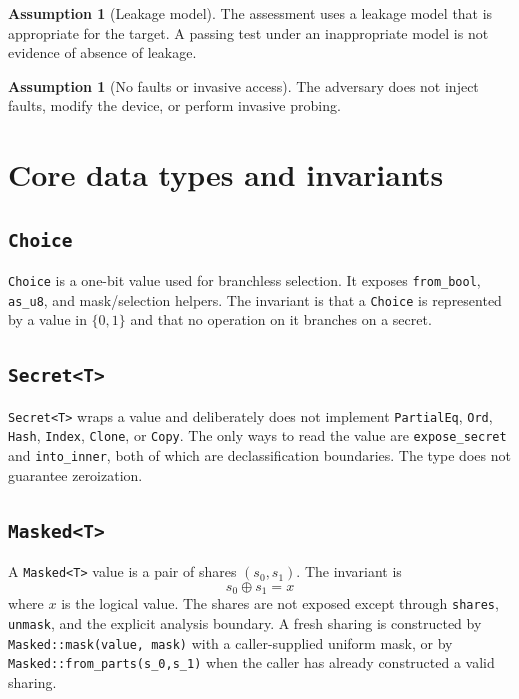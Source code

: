 \documentclass[11pt,a4paper]{article}
\newcommand{\code}[1]{\texttt{#1}}
\theoremstyle{plain}
\theoremstyle{definition}
\newtheorem{assumption}[theorem]{Assumption}
\theoremstyle{remark}
\begin{document}
\begin{assumption}[Leakage model]\label{asm:model}
The assessment uses a leakage model that is appropriate for the target. A passing test
under an inappropriate model is not evidence of absence of leakage.
\end{assumption}

\begin{assumption}[No faults or invasive access]\label{asm:fault}
The adversary does not inject faults, modify the device, or perform invasive probing.
\end{assumption}

\section{Core data types and invariants}\label{sec:types}

\subsection{\code{Choice}}

\code{Choice} is a one-bit value used for branchless selection. It exposes
\code{from\_bool}, \code{as\_u8}, and mask/selection helpers. The invariant is that a
\code{Choice} is represented by a value in \(\{0,1\}\) and that no operation on it
branches on a secret.

\subsection{\code{Secret<T>}}

\code{Secret<T>} wraps a value and deliberately does not implement \code{PartialEq},
\code{Ord}, \code{Hash}, \code{Index}, \code{Clone}, or \code{Copy}. The only ways to
read the value are \code{expose\_secret} and \code{into\_inner}, both of which are
declassification boundaries. The type does not guarantee zeroization.

\subsection{\code{Masked<T>}}

A \code{Masked<T>} value is a pair of shares \((s_0,s_1)\). The invariant is
\[
  s_0\oplus s_1 = x
\]
where \(x\) is the logical value. The shares are not exposed except through
\code{shares}, \code{unmask}, and the explicit analysis boundary. A fresh sharing is
constructed by \code{Masked::mask(value, mask)} with a caller-supplied uniform mask, or
by \code{Masked::from\_parts(s\_0,s\_1)} when the caller has already constructed a valid
sharing.
\end{document}
